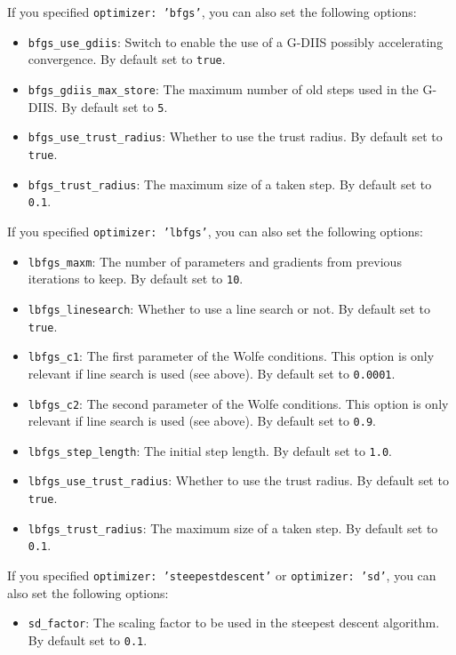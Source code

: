 \documentclass[]{tufte-book}
\begin{document}
If you specified \texttt{optimizer: 'bfgs'}, you can also set the following options:
\begin{itemize}
\item \texttt{bfgs\_use\_gdiis}: Switch to enable the use of a G-DIIS possibly accelerating convergence. By default set to 
\texttt{true}.
\item \texttt{bfgs\_gdiis\_max\_store}: The maximum number of old steps used in the G-DIIS. By default set to \texttt{5}.
\item \texttt{bfgs\_use\_trust\_radius}: Whether to use the trust radius. By default set to \texttt{true}.
\item \texttt{bfgs\_trust\_radius}: The maximum size of a taken step. By default set to \texttt{0.1}.
\end{itemize}

If you specified \texttt{optimizer: 'lbfgs'}, you can also set the following options:
\begin{itemize}
\item \texttt{lbfgs\_maxm}: The number of parameters and gradients from previous iterations to keep. By default set to 
\texttt{10}.
\item \texttt{lbfgs\_linesearch}: Whether to use a line search or not. By default set to \texttt{true}.
\item \texttt{lbfgs\_c1}: The first parameter of the Wolfe conditions. This option is only relevant if line search is
used (see above). By default set to \texttt{0.0001}.
\item \texttt{lbfgs\_c2}:  The second parameter of the Wolfe conditions. This option is only relevant if line search is
used (see above). By default set to \texttt{0.9}.
\item \texttt{lbfgs\_step\_length}: The initial step length. By default set to \texttt{1.0}.
\item \texttt{lbfgs\_use\_trust\_radius}: Whether to use the trust radius. By default set to \texttt{true}.
\item \texttt{lbfgs\_trust\_radius}: The maximum size of a taken step. By default set to \texttt{0.1}.
\end{itemize}

If you specified \texttt{optimizer: 'steepestdescent'} or \texttt{optimizer: 'sd'}, you can also set the following options:
\begin{itemize}
\item \texttt{sd\_factor}: The scaling factor to be used in the steepest descent algorithm. By default set to \texttt{0.1}.
\end{itemize}
\end{document}
